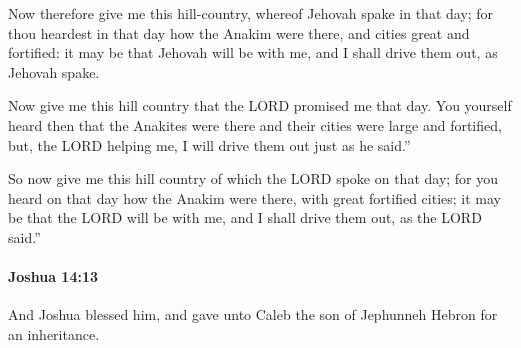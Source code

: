 			\begin{versebox}
					\item[BHS] 
					\item[ASV] Now therefore give me this hill-country, whereof Jehovah spake in that day; for thou heardest in that day how the Anakim were there, and cities great and fortified: it may be that Jehovah will be with me, and I shall drive them out, as Jehovah spake.
					\item[NIV] Now give me this hill country that the LORD promised me that day. You yourself heard then that the Anakites were there and their cities were large and fortified, but, the LORD helping me, I will drive them out just as he said.”
					\item[NRSV] So now give me this hill country of which the LORD spoke on that day; for you heard on that day how the Anakim were there, with great fortified cities; it may be that the LORD will be with me, and I shall drive them out, as the LORD said.”
			\end{versebox}

		\paragraph{Joshua 14:13} %
			\label{JOSHUA-14-13}

			And Joshua blessed him, and gave unto Caleb the son of Jephunneh Hebron for an inheritance.

